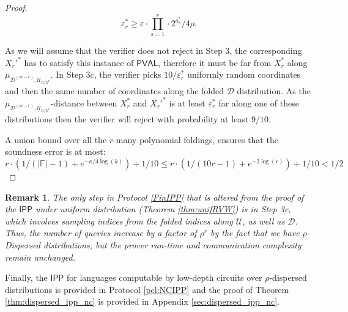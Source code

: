 \documentclass[11pt]{article}
\newtheorem{remark}{Remark}
\newcommand{\PVAL}{\mathsf{PVAL}}
\newcommand{\IPP}{\mathsf{IPP}}
\newcommand{\sU}{\mathcal{U}}
\newcommand{\sD}{\mathcal{D}}
\begin{document}
\begin{proof}
\begin{equation*}
    \varepsilon_{r}^{\ast} \geq \varepsilon\cdot \prod_{s=1}^{r} \cdot 2^{a_{s}^{\ast}}/4\rho.
\end{equation*}

As we will assume that the verifier does not reject in Step 3, the corresponding $X_{r}'^{\ast}$ has to satisfy this instance of $\PVAL$, therefore it must be far from $X_{r}^{\ast}$ along $\mu_{\mathcal{D}^{(m-r)},\mathcal{U}_{n/k^{r}}}$. In Step 3c, the verifier picks $10/\varepsilon_{r}^{\ast}$ uniformly random coordinates and then the same number of coordinates along the folded $\mathcal{D}$ distribution. As the $\mu_{\mathcal{D}^{(m-r)},\mathcal{U}_{n/k^{r}}}$-distance between $X_{r}^{\ast}$ and $X_{r}'^{\ast}$ is at least $\varepsilon^*_r$ far along one of these distributions then the verifier will reject with probability at least $9/10$.

A union bound over all the $r$-many polynomial foldings, ensures that the soundness error is at most:
\begin{equation*}
    r\cdot(1/(\vert \mathbb{F}\vert -1)+e^{-\kappa/4\log (k)})+1/10 \leq r\cdot(1/(10r-1)+e^{-2\log (r)})+1/10 <1/2
\end{equation*}
\end{proof}

\begin{remark}
The only step in Protocol \ref{FinIPP} that is altered from the proof of the $\IPP$ under uniform distribution (Theorem \ref{thm:unifRVW}) is in Step 3c, which involves sampling indices from the folded indices along $\sU$, as well as $\sD$. Thus, the number of queries increase by a factor of $\rho^{r}$ by the fact that we have $\rho$-Dispersed distributions, but the prover run-time and communication complexity remain unchanged.
\end{remark}

\noindent Finally, the $\IPP$ for languages computable by low-depth circuits over $\rho$-dispersed distributions is provided in Protocol \ref{pcl:NCIPP} and the proof of Theorem \ref{thm:dispersed_ipp_nc} is provided in Appendix \ref{sec:dispersed_ipp_nc}.
\end{document}
